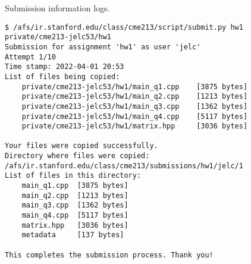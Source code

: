 \documentclass[12pt,letterpaper,twoside]{article}
\begin{document}
Submission information logs.
\begin{verbatim}
$ /afs/ir.stanford.edu/class/cme213/script/submit.py hw1 private/cme213-jelc53/hw1
Submission for assignment 'hw1' as user 'jelc'
Attempt 1/10
Time stamp: 2022-04-01 20:53
List of files being copied:
    private/cme213-jelc53/hw1/main_q1.cpp	 [3875 bytes]
    private/cme213-jelc53/hw1/main_q2.cpp	 [1213 bytes]
    private/cme213-jelc53/hw1/main_q3.cpp	 [1362 bytes]
    private/cme213-jelc53/hw1/main_q4.cpp	 [5117 bytes]
    private/cme213-jelc53/hw1/matrix.hpp	 [3036 bytes]

Your files were copied successfully.
Directory where files were copied: /afs/ir.stanford.edu/class/cme213/submissions/hw1/jelc/1
List of files in this directory:
    main_q1.cpp	 [3875 bytes]
    main_q2.cpp	 [1213 bytes]
    main_q3.cpp	 [1362 bytes]
    main_q4.cpp	 [5117 bytes]
    matrix.hpp	 [3036 bytes]
    metadata	 [137 bytes]

This completes the submission process. Thank you!
\end{verbatim}
\end{document}
